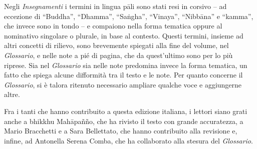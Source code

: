 Negli \emph{Insegnamenti} i termini in lingua pāli sono stati resi in
corsivo -- ad eccezione di ``Buddha'', ``Dhamma'', ``Saṅgha'',
``Vinaya'', ``Nibbāna'' e ``kamma'', che invece sono in tondo -- e compaiono nella forma tematica
oppure al nominativo singolare o plurale, in base al contesto. Questi
termini, insieme ad altri concetti di rilievo, sono brevemente spiegati
alla fine del volume, nel \emph{Glossario}, e nelle note a pié di
pagina, che da quest'ultimo sono per lo più riprese. Sia nel
\emph{Glossario} sia nelle note predomina invece la forma tematica, un
fatto che spiega alcune difformità tra il testo e le note. Per quanto
concerne il \emph{Glossario}, si è talora ritenuto necessario
ampliare qualche voce e aggiungerne altre.

Fra i tanti che hanno contribuito a questa edizione italiana, i lettori
siano grati anche a bhikkhu Mahāpañño, che ha rivisto il testo con
grande accuratezza, a Mario Bracchetti e a Sara Bellettato, che hanno
contribuito alla revisione e, infine, ad Antonella Serena Comba, che ha
collaborato alla stesura del \emph{Glossario}.

